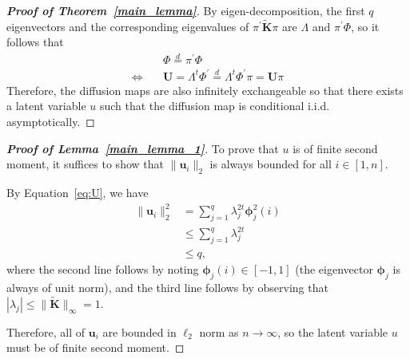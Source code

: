 \documentclass[12pt]{article}
\theoremstyle{definition}
\begin{document}
\begin{proof}[\textbf{Proof of Theorem~\ref{main_lemma}}]
		By eigen-decomposition, the first $q$ eigenvectors and the corresponding eigenvalues of $\pi^{'} \mathbf{\widetilde{K}} \pi$ are $\Lambda$ and $\pi^{'} \Phi$, so it follows that
		\begin{align*}
		& \Phi \stackrel{d}{=} \pi^{'} \Phi\\
		\Leftrightarrow \quad
		& \mathbf{U}=\Lambda^{t} \Phi^{'}  \stackrel{d}{=} \Lambda^{t} \Phi^{'} \pi = \mathbf{U} \pi 
		\end{align*}	
		Therefore, the diffusion maps are also infinitely exchangeable so that there exists a latent variable $u$ such that the diffusion map is conditional i.i.d. asymptotically. 
	\end{proof}
	
	\begin{proof}[\textbf{Proof of Lemma~\ref{main_lemma_1}}]
		To prove that $u$ is of finite second moment, it suffices to show that $\|\mathbf{u}_{i}\|_{2}$ is always bounded for all $i \in [1,n]$.
		
		By Equation~\ref{eq:U}, we have 
		\begin{align*}
		\| \mathbf{u}_i \|_{2}^{2}  &= \sum_{j=1}^{q} \lambda^{2t}_{j}\mathbf{\phi}_{j}^{2}(i) \\ 
		& \leq \sum_{j=1}^{q} \lambda^{2t}_{j} \\
		& \leq q,
		\end{align*}
		where the second line follows by noting $\mathbf{\phi}_{j}(i) \in [-1,1]$ (the eigenvector $\mathbf{\phi}_{j}$ is always of unit norm), and the third line follows by observing that $| \lambda_{j}| \leq \|\widetilde{\mathbf{K}}\|_{\infty}= 1$.
		
		Therefore, all of $\mathbf{u}_{i}$ are bounded in $\ell_{2}$ norm as $n \rightarrow \infty$, so the latent variable $u$ must be of finite second moment.
	\end{proof}
	
\end{document}
